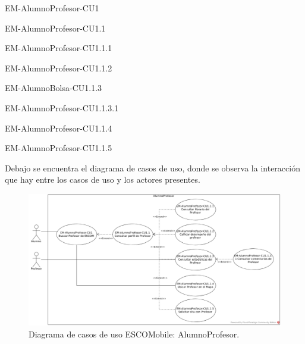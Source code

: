 \begin{requisitos}{EM-AlumnoProfesor-CU1}
\end{requisitos}

\begin{requisitos}{EM-AlumnoProfesor-CU1.1}
\end{requisitos}

\begin{requisitos}{EM-AlumnoProfesor-CU1.1.1}
\end{requisitos}

\begin{requisitos}{EM-AlumnoProfesor-CU1.1.2}
\end{requisitos}

\begin{requisitos}{EM-AlumnoBolsa-CU1.1.3}
\end{requisitos}

\begin{requisitos}{EM-AlumnoProfesor-CU1.1.3.1}
\end{requisitos}

\begin{requisitos}{EM-AlumnoProfesor-CU1.1.4}
\end{requisitos}

\begin{requisitos}{EM-AlumnoProfesor-CU1.1.5}
\end{requisitos}

\noindent
Debajo se encuentra el diagrama de casos de uso, donde se observa la interacción que hay
entre los casos de uso y los actores presentes.

\pagebreak
\begin{figure}[htbp!]
	\centering
	\includegraphics[width=1\textwidth]{images/casos/alumnoProfesor}
	\caption{Diagrama de casos de uso ESCOMobile: AlumnoProfesor.}
\end{figure}


